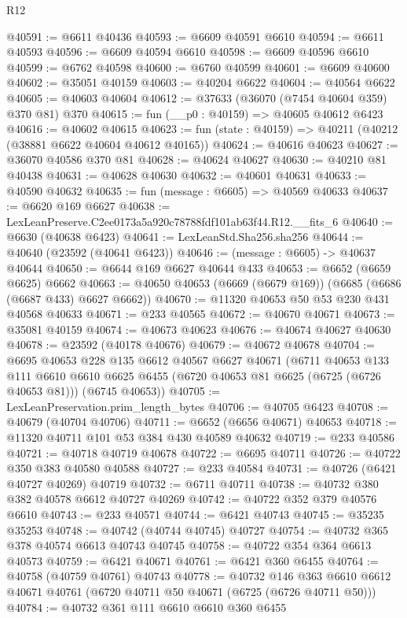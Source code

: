 \begin{lexlean}{R12}
\begin{coremodule}
@40591 := @6611 @40436
@40593 := @6609 @40591 @6610
@40594 := @6611 @40593
@40596 := @6609 @40594 @6610
@40598 := @6609 @40596 @6610
@40599 := @6762 @40598
@40600 := @6760 @40599
@40601 := @6609 @40600
@40602 := @35051 @40159
@40603 := @40204 @6622
@40604 := @40564 @6622
@40605 := @40603 @40604
@40612 := @37633 (@36070 (@7454 @40604 @359) @370 @81) @370
@40615 := fun (__p0 : @40159) => @40605 @40612 @6423
@40616 := @40602 @40615
@40623 := fun (state : @40159) => @40211 (@40212 (@38881 @6622 @40604 @40612 @40165))
@40624 := @40616 @40623
@40627 := @36070 @40586 @370 @81
@40628 := @40624 @40627
@40630 := @40210 @81 @40438
@40631 := @40628 @40630
@40632 := @40601 @40631
@40633 := @40590 @40632
@40635 := fun (message : @6605) => @40569 @40633
@40637 := @6620 @169 @6627
@40638 := LexLeanPreserve.C2ee0173a5a920c78788fdf101ab63f44.R12.__fits_6
@40640 := @6630 (@40638 @6423)
@40641 := LexLeanStd.Sha256.sha256
@40644 := @40640 (@23592 (@40641 @6423))
@40646 := (message : @6605) -> @40637 @40644
@40650 := @6644 @169 @6627 @40644 @433
@40653 := @6652 (@6659 @6625) @6662
@40663 := @40650 @40653 (@6669 (@6679 @169)) (@6685 (@6686 (@6687 @433) @6627 @6662))
@40670 := @11320 @40653 @50 @53 @230 @431 @40568 @40633
@40671 := @233 @40565
@40672 := @40670 @40671
@40673 := @35081 @40159
@40674 := @40673 @40623
@40676 := @40674 @40627 @40630
@40678 := @23592 (@40178 @40676)
@40679 := @40672 @40678
@40704 := @6695
    @40653
    @228
    @135
    @6612
    @40567
    @6627
    @40671
    (@6711
      @40653
      @133
      @111
      @6610
      @6610
      @6625
      @6455
      (@6720 @40653 @81 @6625 (@6725 (@6726 @40653 @81)))
      (@6745 @40653))
@40705 := LexLeanPreservation.prim_length_bytes
@40706 := @40705 @6423
@40708 := @40679 (@40704 @40706)
@40711 := @6652 (@6656 @40671) @40653
@40718 := @11320 @40711 @101 @53 @384 @430 @40589 @40632
@40719 := @233 @40586
@40721 := @40718 @40719 @40678
@40722 := @6695 @40711
@40726 := @40722 @350 @383 @40580 @40588
@40727 := @233 @40584
@40731 := @40726 (@6421 @40727 @40269) @40719
@40732 := @6711 @40711
@40738 := @40732 @380 @382 @40578 @6612 @40727 @40269
@40742 := @40722 @352 @379 @40576 @6610
@40743 := @233 @40571
@40744 := @6421 @40743
@40745 := @35235 @35253
@40748 := @40742 (@40744 @40745) @40727
@40754 := @40732 @365 @378 @40574 @6613 @40743 @40745
@40758 := @40722 @354 @364 @6613 @40573
@40759 := @6421 @40671
@40761 := @6421 @360 @6455
@40764 := @40758 (@40759 @40761) @40743
@40778 := @40732
    @146
    @363
    @6610
    @6612
    @40671
    @40761
    (@6720 @40711 @50 @40671 (@6725 (@6726 @40711 @50)))
@40784 := @40732 @361 @111 @6610 @6610 @360 @6455

\end{coremodule}
\end{lexlean}
